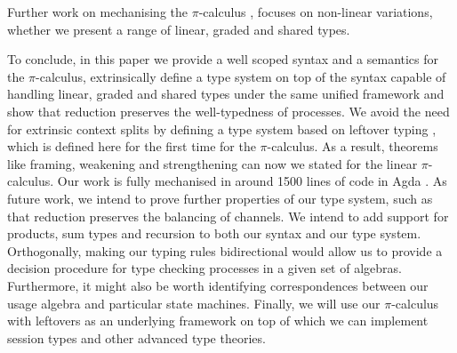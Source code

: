 \documentclass[a4paper,UKenglish,cleveref,autoref,thm-restate,authorcolumns]{lipics-v2019}
\theoremstyle{definition}
\newcommand{\picalc}{$\pi$-calculus}
\begin{document}
Further work on mechanising the \picalc{} \cite{Henry-Gerard1999, Honsell2001a, Bengtson2013, Despeyroux2000, Affeldt2008}, focuses on  non-linear variations, whether we present a range of linear, graded and shared types.

To conclude, in this paper we provide a well scoped syntax and a semantics for the \picalc{}, extrinsically define a type system on top of the syntax capable of handling linear, graded and shared types under the same unified framework and show that reduction preserves the well-typedness of processes.
We avoid the need for extrinsic context splits by defining a type system based on leftover typing \cite{Allais2018a}, which is defined here for the first time for the \picalc{}.
As a result, theorems like framing, weakening and strengthening can now we stated for the linear \picalc{}.
Our work is fully mechanised in around 1500 lines of code in Agda \cite{Zalakain2020Agda}.
%
As future work, we intend to prove further properties of our type system, such as that reduction preserves the balancing of channels.
We intend to add support for products, sum types and recursion to both our syntax and our type system.
Orthogonally, making our typing rules bidirectional would allow us to provide a decision procedure for type checking processes in a given set of algebras.
Furthermore, it might also be worth identifying correspondences between our usage algebra and particular state machines.
Finally, we will use our \picalc{} with leftovers as an underlying framework on top of which we can implement session types and other advanced type theories.

\newpage


\newpage
\appendix

\end{document}
